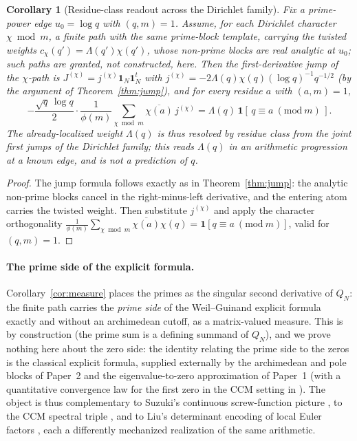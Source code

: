 \documentclass[11pt]{article}
\theoremstyle{plain}
\newtheorem{corollary}[theorem]{Corollary}
\theoremstyle{definition}
\theoremstyle{remark}
\newcommand{\one}{\mathbf 1}
\newcommand{\Lam}{\Lambda}
\begin{document}
\begin{corollary}[Residue-class readout across the Dirichlet family]\label{cor:dirichlet}
Fix a prime-power edge $u_0=\log q$ with $(q,m)=1$. Assume, for each Dirichlet
character $\chi\bmod m$, a finite path with the same prime-block template,
carrying the twisted weights $c_\chi(q')=\Lam(q')\chi(q')$, whose non-prime
blocks are real analytic at $u_0$; such paths are granted, not constructed,
here. Then the first-derivative jump of the $\chi$-path is
$J^{(\chi)}=j^{(\chi)}\one_N\one_N^t$ with
$j^{(\chi)}=-2\Lam(q)\chi(q)(\log q)^{-1}q^{-1/2}$ (by the argument of
Theorem~\ref{thm:jump}), and for every residue $a$ with
$(a,m)=1$,
\[
 -\frac{\sqrt q\,\log q}{2}\cdot\frac{1}{\phi(m)}
 \sum_{\chi\bmod m}\overline{\chi(a)}\,j^{(\chi)}
 =\Lam(q)\,\mathbf 1[\,q\equiv a\ (\mathrm{mod}\ m)\,].
\]
The already-localized weight $\Lam(q)$ is thus resolved by residue class from the
joint first jumps of the Dirichlet family; this reads $\Lam(q)$ in an arithmetic
progression at a known edge, and is not a prediction of $q$.
\end{corollary}

\begin{proof}
The jump formula follows exactly as in Theorem~\ref{thm:jump}: the analytic
non-prime blocks cancel in the right-minus-left derivative, and the entering
atom carries the twisted weight. Then
substitute $j^{(\chi)}$ and apply the character orthogonality
$\frac{1}{\phi(m)}\sum_{\chi\bmod m}\overline{\chi(a)}\chi(q)
=\mathbf 1[q\equiv a\ (\mathrm{mod}\ m)]$, valid for $(q,m)=1$.
\end{proof}

\paragraph{The prime side of the explicit formula.}
Corollary~\ref{cor:measure} places the primes as the singular second derivative
of $Q_N$: the finite path carries the \emph{prime side} of the Weil--Guinand
explicit formula \cite{Weil1952,IwaniecKowalski2004} exactly and without an
archimedean cutoff, as a matrix-valued measure. This is by construction (the
prime sum is a defining summand of $Q_N$), and we prove nothing here about the
zero side: the identity relating the prime side to the zeros is the classical
explicit formula, supplied externally by the archimedean and pole blocks of
Paper~2 \cite{Groskin2026FiniteDictionary} and the eigenvalue-to-zero
approximation of Paper~1 \cite{Groskin2026Paper1} (with a quantitative
convergence law for the first zero in the CCM setting in
\cite{Andrews2026}). The object is thus
complementary to Suzuki's continuous screw-function picture \cite{Suzuki2026},
to the CCM spectral triple \cite{ConnesConsaniMoscovici2025}, and to Liu's
determinant encoding of local Euler factors \cite{Liu2026}, each a differently
mechanized realization of the same arithmetic.
\end{document}
